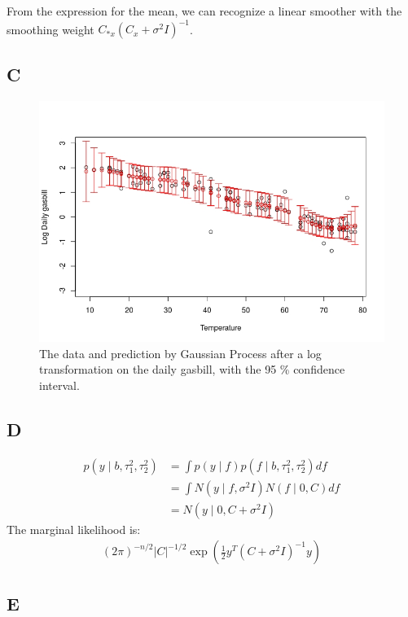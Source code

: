 \documentclass{article}
\begin{document}
From the expression for the mean, we can recognize a linear smoother with the smoothing weight \( C_{*x} (C_x + \sigma^2 I)^{-1} \).

\subsection*{C}
\begin{figure}
\includegraphics[width=\textwidth]{util_gp_ci.jpeg}
\caption{The data and prediction by Gaussian Process after a log transformation on the daily gasbill, with the 95 \% confidence interval.}
\label{fig:util_log}
\end{figure}


\subsection*{D}
\begin{align*}
p(y \mid b, \tau_1^2, \tau_2^2) &= \int p(y \mid f) p( f \mid b, \tau_1^2, \tau_2^2) df\\
&= \int N(y \mid f, \sigma^2 I) N(f \mid 0, C) df \\
&= N(y \mid 0, C + \sigma^2 I)
\end{align*}
The marginal likelihood is:
\begin{align*}
(2\pi)^{-n/2} |C|^{-1/2} \exp \left( \frac{1}{2} y^T (C + \sigma^2 I)^{-1} y \right)
\end{align*}

\subsection*{E}
\end{document}

